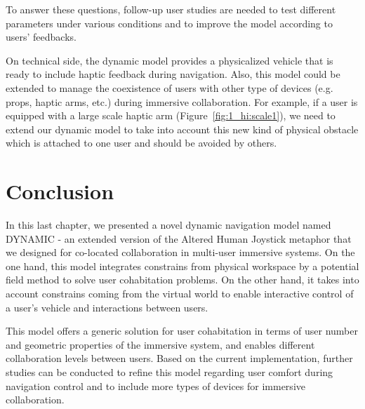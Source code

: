 To answer these questions, follow-up user studies are needed to test different parameters under various conditions and to improve the model according to users' feedbacks.

On technical side, the dynamic model provides a physicalized vehicle that is ready to include haptic feedback during navigation. Also, this model could be extended to manage the coexistence of users with other type of devices (e.g. props, haptic arms, etc.) during immersive collaboration. For example, if a user is equipped with a large scale haptic arm (Figure~\ref{fig:1_hi:scale1}), we need to extend our dynamic model to take into account this new kind of physical obstacle which is attached to one user and should be avoided by others.


\section{Conclusion}
In this last chapter, we presented a novel dynamic navigation model named DYNAMIC - an extended version of the Altered Human Joystick metaphor that we designed for co-located collaboration in multi-user immersive systems. On the one hand, this model integrates constrains from physical workspace by a potential field method to solve user cohabitation problems. On the other hand, it takes into account constrains coming from the virtual world to enable interactive control of a user's vehicle and interactions between users.

This model offers a generic solution for user cohabitation in terms of user number and geometric properties of the immersive system, and enables different collaboration levels between users. Based on the current implementation, further studies can be conducted to refine this model regarding user comfort during navigation control and to include more types of devices for immersive collaboration.